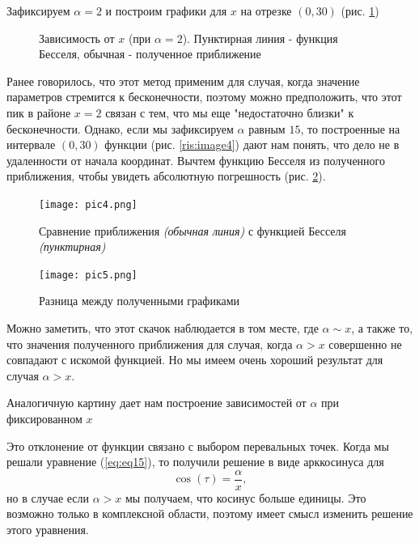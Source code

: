 \documentclass[14pt]{extarticle}
\begin{document}
Зафиксируем $\alpha=2$ и построим графики для $x$ на отрезке $(0, 30)$ (рис. \ref{ris:image3})

\begin{figure}[h!]
	\caption{Зависимость от $x$ (при $\alpha=2$). Пунктирная линия - функция Бесселя, обычная - полученное приближение}
	\label{ris:image3}
\end{figure}

Ранее говорилось, что этот метод применим для случая, когда значение параметров стремится к бесконечности, поэтому можно предположить, что этот пик в районе $x = 2$ связан с тем, что мы еще "недостаточно близки" к бесконечности. Однако, если мы зафиксируем $\alpha$ равным $15$, то построенные на интервале $(0,30)$ функции (рис. \ref{ris:image4}) дают нам понять, что дело не в удаленности от начала координат. Вычтем функцию Бесселя из полученного приближения, чтобы увидеть абсолютную погрешность (рис. \ref{ris:image5}).

\begin{figure}[h]
	\begin{center}
		\begin{minipage}[h]{0.45\linewidth}
			\texttt{[image: pic4.png]}
			\caption{Сравнение приближения \textit{(обычная линия)} с функцией Бесселя \textit{(пунктирная)}} %
			\label{ris:image4} %
		\end{minipage}
				\hfill 
		\begin{minipage}[h]{0.45\linewidth}
			\texttt{[image: pic5.png]}
			\caption{Разница между полученными графиками}
			\label{ris:image5}
		\end{minipage}
	\end{center}
\end{figure}

Можно заметить, что этот скачок наблюдается в том месте, где $\alpha \sim x$, а также то, что значения полученного приближения для случая, когда $\alpha > x$ совершенно не совпадают с искомой функцией. Но мы имеем очень хороший результат для случая $\alpha > x$.

Аналогичную картину дает нам построение зависимостей от $\alpha$ при фиксированном $x$

Это отклонение от функции связано с выбором перевальных точек. Когда мы решали уравнение (\ref{eq:eq15}), то получили решение в виде арккосинуса для
$$
\cos(\tau)=\frac{\alpha}{x},
$$
но в случае если $\alpha>x$ мы получаем, что косинус больше единицы. Это возможно только в комплексной области, поэтому имеет смысл изменить решение этого уравнения.\cite{Wong}
\end{document}
